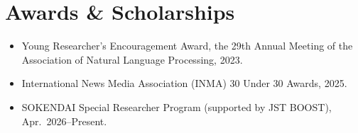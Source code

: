\documentclass[10pt,letterpaper]{article}
\begin{document}
\section*{Awards \& Scholarships}
\begin{itemize}
  \item Young Researcher's Encouragement Award, the 29th Annual Meeting of the Association of Natural Language Processing, 2023.
  \item International News Media Association (INMA) 30 Under 30 Awards, 2025.
  \item SOKENDAI Special Researcher Program (supported by JST BOOST), Apr.\ 2026--Present.
\end{itemize}
\end{document}
